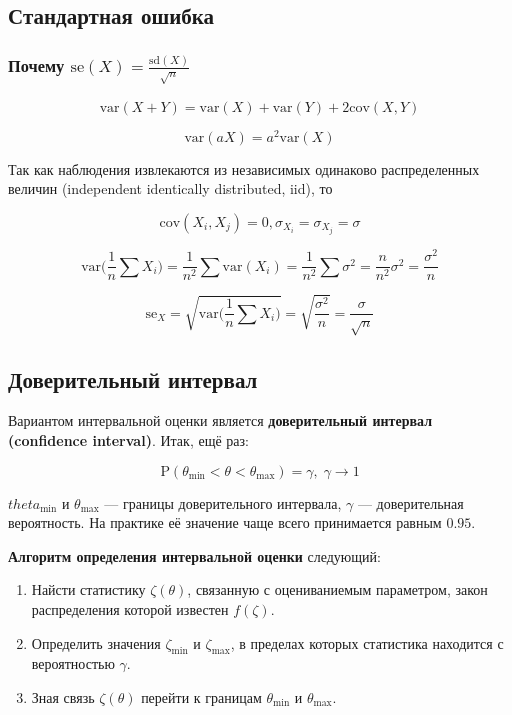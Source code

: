 \documentclass[
  letterpaper,
  DIV=11,
  numbers=noendperiod]{scrreprt}
\providecommand{\tightlist}{%
  \setlength{\itemsep}{0pt}\setlength{\parskip}{0pt}}\usepackage{longtable,booktabs,array}
\newcommand{\var}{\text{var}}
\newcommand{\cov}{\text{cov}}
\newcommand{\se}{\text{se}}
\newcommand{\sd}{\text{sd}}
\theoremstyle{definition}
\theoremstyle{remark}
\begin{document}
\subsection{Стандартная
ошибка}\label{ux441ux442ux430ux43dux434ux430ux440ux442ux43dux430ux44f-ux43eux448ux438ux431ux43aux430}

\subsubsection{\texorpdfstring{Почему
\(\se(X) = \frac{\sd(X)}{\sqrt{n}}\)}{Почему \textbackslash se(X) = \textbackslash frac\{\textbackslash sd(X)\}\{\textbackslash sqrt\{n\}\}}}\label{ux43fux43eux447ux435ux43cux443-sex-fracsdxsqrtn}

\[
\var (X + Y) = \var (X) + \var(Y) + 2 \cov (X, Y)
\]

\[
\var (aX) = a^2 \var (X)
\]

Так как наблюдения извлекаются из независимых одинаково распределенных
величин (independent identically distributed, iid), то

\[
\cov (X_i, X_j) = 0, \sigma_{X_i} = \sigma_{X_j} = \sigma
\]

\[
\var \Big( \frac{1}{n} \sum X_i \Big) = \frac{1}{n^2} \sum \var(X_i) = \frac{1}{n^2} \sum \sigma^2 = \frac{n}{n^2} \sigma^2 = \frac{\sigma^2}{n}
\]

\[
\se_X = \sqrt{ \var \Big( \frac{1}{n} \sum X_i \Big)} = \sqrt{\frac{\sigma^2}{n}} = \frac{\sigma}{\sqrt{n}}
\]

\subsection{Доверительный
интервал}\label{ux434ux43eux432ux435ux440ux438ux442ux435ux43bux44cux43dux44bux439-ux438ux43dux442ux435ux440ux432ux430ux43b}

Вариантом интервальной оценки является \textbf{доверительный интервал
(confidence interval)}. Итак, ещё раз:

\[
\mathrm{P}(\theta_\min < \theta < \theta_\max) = \gamma, \; \gamma \rightarrow 1
\]

\(theta_\min\) и \(\theta_\max\) --- границы доверительного интервала,
\(\gamma\) --- доверительная вероятность. На практике её значение чаще
всего принимается равным \(0.95\).

\textbf{Алгоритм определения интервальной оценки} следующий:

\begin{enumerate}
\def\labelenumi{\arabic{enumi})}
\tightlist
\item
  Найсти статистику \(\zeta(\theta)\), связанную с оцениваниемым
  параметром, закон распределения которой известен \(f(\zeta)\).
\item
  Определить значения \(\zeta_\min\) и \(\zeta_\max\), в пределах
  которых статистика находится с вероятностью \(\gamma\).
\item
  Зная связь \(\zeta(\theta)\) перейти к границам \(\theta_\min\) и
  \(\theta_\max\).
\end{enumerate}
\end{document}
